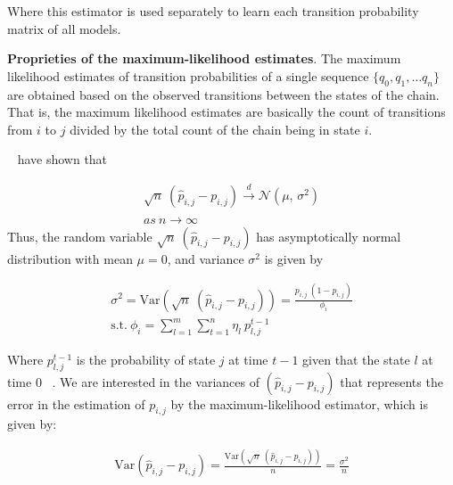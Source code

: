 Where this estimator is used separately to learn each transition probability matrix of all \pmcmr models.   


\textbf{Proprieties of the maximum-likelihood estimates}. 
	The maximum likelihood estimates of transition probabilities of a single sequence $\{q_0, q_1, \ldots q_n\}$  are obtained based on the observed transitions between the states of the chain. That is, the maximum likelihood estimates are basically the count of transitions from $i$ to $j$ divided by the total count of the chain being in state $i$.  
	
	\par ~\citet{anderson1957statistical} have shown that 
	
	

	\begin{equation}
	\begin{aligned}
	\label{eq:lim_dist}
	 \sqrt{n}\ (\hat{p}_{i,j} - {p}_{i,j}) \xrightarrow{d} \mathcal{N}(\mu,\,\sigma^{2})\\
	 as\ n \xrightarrow{} \infty
	 \end{aligned}
	\end{equation}
Thus, the random variable $\sqrt{n}\ (\hat{p}_{i,j} - {p}_{i,j})$ has asymptotically normal distribution with mean $\mu=0$, and  variance  $\sigma^{2}$ is given by   

\begin{equation}
\begin{aligned}
\sigma^{2}=\mathrm{Var}(\sqrt{n}\ (\hat{p}_{i,j} - {p}_{i,j})) = \frac {{p}_{i,j}\ (1- {p}_{i,j})} {\phi_{i}} \\
\text{s.t.}\ \phi_{i} = \sum_{l=1}^{m} \sum_{t=1}^{n} \eta_{l} \ p_{l,j}^{t-1}
\end{aligned}
\end{equation}

Where $p_{l,j}^{t-1}$ is the probability of state $j$ at time $t-1$ given that the state $l$ at time $0$ ~\cite{anderson1957statistical}. We are interested in the variances of $(\hat{p}_{i,j} - {p}_{i,j})$ that represents the error in the estimation of ${p}_{i,j}$ by the maximum-likelihood estimator, which is given by:

	\begin{equation}
\begin{aligned}
\label{eq:var_isol}
	\mathrm{Var} (\hat{p}_{i,j} - {p}_{i,j}) =  \frac {\mathrm{Var}(\sqrt{n}\ (\hat{p}_{i,j} - {p}_{i,j}))}{n} = \frac {\sigma^{2}}{n} 
\end{aligned}
\end{equation}

